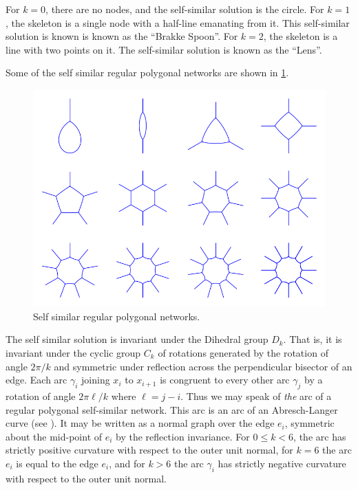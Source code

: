\documentclass[12pt]{amsart}
\begin{document}
\begin{remark}
For \(k = 0\), there are no nodes, and the self-similar solution is the circle. For \(k = 1\), the skeleton is a single node with a half-line emanating from it. This self-similar solution is known is known as the ``Brakke Spoon''. For $k=2$, the skeleton is a line with two points on it. The self-similar solution is known as the ``Lens''.
\end{remark}

Some of the self similar regular polygonal networks are shown in \ref{fg:selfsimilarregularpolygon}.

\begin{figure}[htb]
\centering
\includegraphics[width=.9\linewidth]{selfsimilarregularpolygon}
\caption{Self similar regular polygonal networks.}
\label{fg:selfsimilarregularpolygon}
\end{figure}

The self similar solution is invariant under the Dihedral group \(D_k\). That is, it is invariant under the cyclic group \(C_k\) of rotations generated by the rotation of angle \(2\pi/k\) and symmetric under reflection across the perpendicular bisector of an edge. Each arc \(\gamma_i\) joining \(x_i\) to \(x_{i+1}\) is congruent to every other arc \(\gamma_j\) by a rotation of angle \(2\pi \ell/k\) where \(\ell = j - i\). Thus we may speak of \emph{the} arc of a regular polygonal self-similar network. This arc is an arc of an Abresch-Langer curve (see \cite{MR845704,MR2931330}). It may be written as a normal graph over the edge \(e_i\), symmetric about the mid-point of \(e_i\) by the reflection invariance. For \(0 \leq k < 6\), the arc has strictly positive curvature with respect to the outer unit normal, for \(k = 6\) the arc \(e_i\) is equal to the edge \(e_i\), and for \(k > 6\) the arc \(\gamma_i\) has strictly negative curvature with respect to the outer unit normal.
\end{document}
